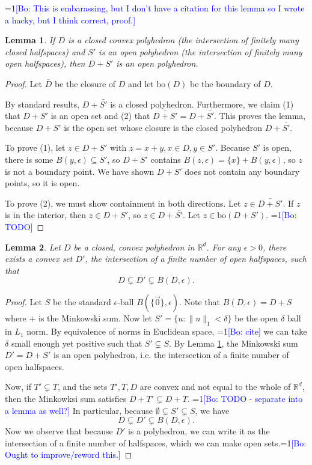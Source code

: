 \documentclass{article}
\newcommand{\Comments}{1}
\newcommand{\mynote}[2]{\ifnum\Comments=1\textcolor{#1}{#2}\fi}
\newcommand{\bo}[1]{\mynote{blue}{[Bo: #1]}}
\newcommand{\reals}{\mathbb{R}}
\newtheorem{lemma}{Lemma}
\begin{document}
\bo{This is embarassing, but I don't have a citation for this lemma so I wrote a hacky, but I think correct, proof.}
\begin{lemma} \label{lemma:open-plus-closed-poly}
  If $D$ is a closed convex polyhedron (the intersection of finitely many closed halfspaces) and $S'$ is an open polyhedron (the intersection of finitely many open halfspaces), then $D+S'$ is an open polyhedron.
\end{lemma}
\begin{proof}
  Let $\bar{D}$ be the closure of $D$ and let $\text{bo}(D)$ be the boundary of $D$.

  By standard results, $D + \bar{S'}$ is a closed polyhedron.
  Furthermore, we claim (1) that $D + S'$ is an open set and (2) that $\bar{D + S'} = D + \bar{S'}$.
  This proves the lemma, because $D+S'$ is the open set whose closure is the closed polyhedron $D + \bar{S'}$.

  To prove (1), let $z \in D + S'$ with $z=x+y, x \in D, y \in S'$.
  Because $S'$ is open, there is some $B(y,\epsilon) \subseteq S'$, so $D+S'$ contains $B(z,\epsilon) = \{x\} + B(y,\epsilon)$, so $z$ is not a boundary point.
  We have shown $D + S'$ does not contain any boundary points, so it is open.

  To prove (2), we must show containment in both directions.
  Let $z \in \bar{D+S'}$.
  If $z$ is in the interior, then $z \in D+S'$, so $z \in D + \bar{S'}$.
  Let $z \in \text{bo}(D+S')$.
  \bo{TODO}
\end{proof}

\begin{lemma} \label{lemma:enclose-halfspaces}
  Let $D$ be a closed, convex polyhedron in $\reals^d$.
  For any $\epsilon > 0$, there exists a convex set $D'$, the intersection of a finite number of open halfspaces, such that
    \[ D \subsetneq D' \subsetneq B(D,\epsilon) . \]
\end{lemma}
\begin{proof}
  Let $S$ be the standard $\epsilon$-ball $B(\{\vec{0}\},\epsilon)$.
  Note that $B(D,\epsilon) = D + S$ where $+$ is the Minkowski sum.
  Now let $S' = \{u : \|u\|_1 < \delta\}$ be the open $\delta$ ball in $L_1$ norm.
  By equivalence of norms in Euclidean space, \bo{cite} we can take $\delta$ small enough yet positive such that $S' \subsetneq S$.
  By Lemma \ref{lemma:open-plus-closed-poly}, the Minkowski sum $D' = D + S'$ is an open polyhedron, i.e. the intersection of a finite number of open halfspaces.

  Now, if $T' \subsetneq T$, and the sets $T',T,D$ are convex and not equal to the whole of $\reals^d$, then the Minkowksi sum satisfies $D + T' \subsetneq D + T$.
  \bo{TODO - separate into a lemma as well?}
  In particular, because $\emptyset \subsetneq S' \subsetneq S$, we have
    \[ D \subsetneq D' \subsetneq B(D,\epsilon) . \]
  Now we observe that because $D'$ is a polyhedron, we can write it as the intersection of a finite number of halfspaces, which we can make open sets.\bo{Ought to improve/reword this.}
\end{proof}
\end{document}
